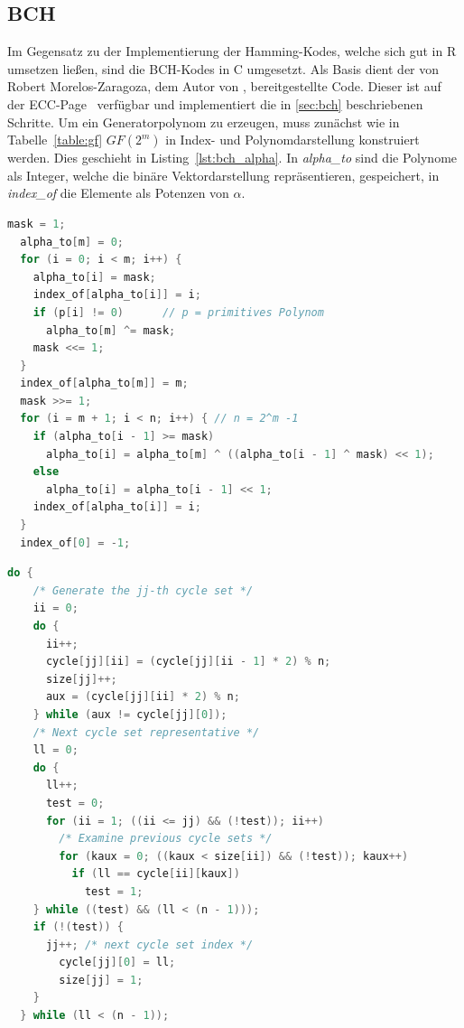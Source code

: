 \subsection{BCH}

Im Gegensatz zu der Implementierung der Hamming-Kodes, welche sich gut in R umsetzen ließen, sind die BCH-Kodes in C umgesetzt. Als Basis dient der von Robert Morelos-Zaragoza, dem Autor von \cite{morelos2006art}, bereitgestellte Code. Dieser ist auf der ECC-Page~\cite{eccpage} verfügbar und implementiert die in \ref{sec:bch} beschriebenen Schritte. Um ein Generatorpolynom zu erzeugen, muss zunächst wie in Tabelle~\ref{table:gf} $GF(2^m)$ in Index- und Polynomdarstellung konstruiert werden. Dies geschieht in Listing~\ref{lst:bch_alpha}. In \emph{alpha\_to} sind die Polynome als Integer, welche die binäre Vektordarstellung repräsentieren, gespeichert, in \emph{index\_of} die Elemente als Potenzen von $\alpha$.

\begin{lstlisting}[caption=Konstruieren des $GF(2^m)$, label={lst:bch_alpha}, language=C++]
  mask = 1;
  alpha_to[m] = 0;
  for (i = 0; i < m; i++) {
    alpha_to[i] = mask;
    index_of[alpha_to[i]] = i;
    if (p[i] != 0)		// p = primitives Polynom
      alpha_to[m] ^= mask;
    mask <<= 1;
  }
  index_of[alpha_to[m]] = m;
  mask >>= 1;
  for (i = m + 1; i < n; i++) {	// n = 2^m -1
    if (alpha_to[i - 1] >= mask)
      alpha_to[i] = alpha_to[m] ^ ((alpha_to[i - 1] ^ mask) << 1);
    else
      alpha_to[i] = alpha_to[i - 1] << 1;
    index_of[alpha_to[i]] = i;
  }
  index_of[0] = -1;
\end{lstlisting}

\begin{lstlisting}[caption=Finden aller Zykel $\mod 2^m-1$, label={lst:bch_cycle}, language=C++]
  do {
    /* Generate the jj-th cycle set */
    ii = 0;
    do {
      ii++;
      cycle[jj][ii] = (cycle[jj][ii - 1] * 2) % n;
      size[jj]++;
      aux = (cycle[jj][ii] * 2) % n;
    } while (aux != cycle[jj][0]);
    /* Next cycle set representative */
    ll = 0;
    do {
      ll++;
      test = 0;
      for (ii = 1; ((ii <= jj) && (!test)); ii++)
        /* Examine previous cycle sets */
        for (kaux = 0; ((kaux < size[ii]) && (!test)); kaux++)
          if (ll == cycle[ii][kaux])
            test = 1;
    } while ((test) && (ll < (n - 1)));
    if (!(test)) {
      jj++; /* next cycle set index */
        cycle[jj][0] = ll;
        size[jj] = 1;
    }
  } while (ll < (n - 1));
\end{lstlisting}

